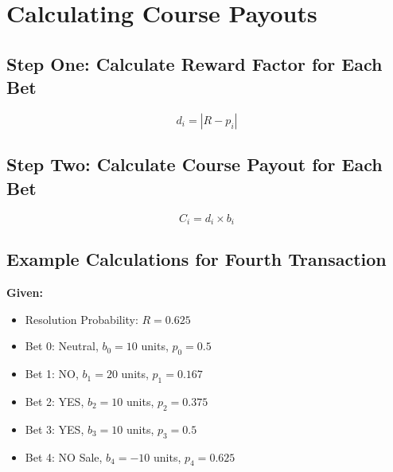 \documentclass{article}
\begin{document}
\begin{center}
\end{center}

\section*{Calculating Course Payouts}


\subsection*{Step One: Calculate Reward Factor for Each Bet}

\[
d_i = |R - p_i|
\]

\subsection*{Step Two: Calculate Course Payout for Each Bet}

\[
C_i = d_i \times b_i
\]

\subsection*{Example Calculations for Fourth Transaction}

\textbf{Given:}

\begin{itemize}
  \item Resolution Probability: \( R = 0.625 \)
  \item Bet 0: Neutral, \( b_0 = 10 \) units, \( p_0 = 0.5 \)
  \item Bet 1: NO, \( b_1 = 20 \) units, \( p_1 = 0.167 \)
  \item Bet 2: YES, \( b_2 = 10 \) units, \( p_2 = 0.375 \)
  \item Bet 3: YES, \( b_3 = 10 \) units, \( p_3 = 0.5 \)
  \item Bet 4: NO Sale, \( b_4 = -10 \) units, \( p_4 = 0.625 \)
\end{itemize}
\end{document}
